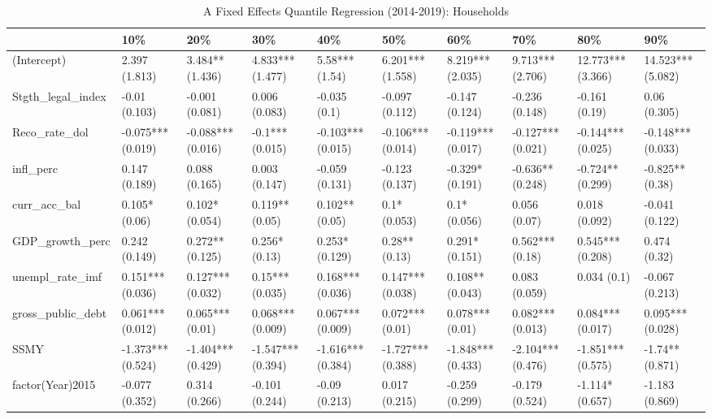 \begin{table}[ht]
\centering
\caption{A Fixed Effects Quantile Regression (2014-2019): Households} 
\begingroup\small
\begin{tabular}{llllllllll}
  \toprule
 & 10\% & 20\% & 30\% & 40\% & 50\% & 60\% & 70\% & 80\% & 90\% \\ 
  \midrule
(Intercept) & 2.397 (1.813) & 3.484** (1.436) & 4.833*** (1.477) & 5.58*** (1.54) & 6.201*** (1.558) & 8.219*** (2.035) & 9.713*** (2.706) & 12.773*** (3.366) & 14.523*** (5.082) \\ 
  Stgth\_legal\_index & -0.01 (0.103) & -0.001 (0.081) & 0.006 (0.083) & -0.035 (0.1) & -0.097 (0.112) & -0.147 (0.124) & -0.236 (0.148) & -0.161 (0.19) & 0.06 (0.305) \\ 
  Reco\_rate\_dol & -0.075*** (0.019) & -0.088*** (0.016) & -0.1*** (0.015) & -0.103*** (0.015) & -0.106*** (0.014) & -0.119*** (0.017) & -0.127*** (0.021) & -0.144*** (0.025) & -0.148*** (0.033) \\ 
  infl\_perc & 0.147 (0.189) & 0.088 (0.165) & 0.003 (0.147) & -0.059 (0.131) & -0.123 (0.137) & -0.329* (0.191) & -0.636** (0.248) & -0.724** (0.299) & -0.825** (0.38) \\ 
  curr\_acc\_bal & 0.105* (0.06) & 0.102* (0.054) & 0.119** (0.05) & 0.102** (0.05) & 0.1* (0.053) & 0.1* (0.056) & 0.056 (0.07) & 0.018 (0.092) & -0.041 (0.122) \\ 
  GDP\_growth\_perc & 0.242 (0.149) & 0.272** (0.125) & 0.256* (0.13) & 0.253* (0.129) & 0.28** (0.13) & 0.291* (0.151) & 0.562*** (0.18) & 0.545*** (0.208) & 0.474 (0.32) \\ 
  unempl\_rate\_imf & 0.151*** (0.036) & 0.127*** (0.032) & 0.15*** (0.035) & 0.168*** (0.036) & 0.147*** (0.038) & 0.108** (0.043) & 0.083 (0.059) & 0.034 (0.1) & -0.067 (0.213) \\ 
  gross\_public\_debt & 0.061*** (0.012) & 0.065*** (0.01) & 0.068*** (0.009) & 0.067*** (0.009) & 0.072*** (0.01) & 0.078*** (0.01) & 0.082*** (0.013) & 0.084*** (0.017) & 0.095*** (0.028) \\ 
  SSMY & -1.373*** (0.524) & -1.404*** (0.429) & -1.547*** (0.394) & -1.616*** (0.384) & -1.727*** (0.388) & -1.848*** (0.433) & -2.104*** (0.476) & -1.851*** (0.575) & -1.74** (0.871) \\ 
  factor(Year)2015 & -0.077 (0.352) & 0.314 (0.266) & -0.101 (0.244) & -0.09 (0.213) & 0.017 (0.215) & -0.259 (0.299) & -0.179 (0.524) & -1.114* (0.657) & -1.183 (0.869) \\ 

\end{tabular}
\end{table}
